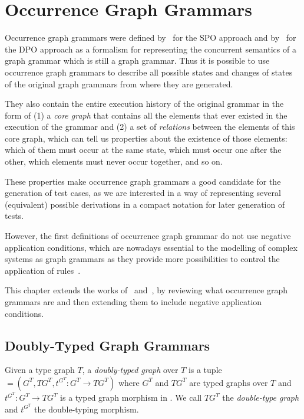 \chapter{Occurrence Graph Grammars}\label{ch:process}

Occurrence graph grammars were defined by~\cite{Ribeiro1996} for the SPO approach and by~\cite{Corradini1996} for the DPO approach as a formalism for representing the concurrent semantics of a graph grammar which is still a graph grammar. Thus it is possible to use occurrence graph grammars to describe all possible states and changes of states of the original graph grammars from where they are generated. 

They also contain the entire execution history of the original grammar in the form of (1) a \emph{core graph} that contains all the elements that ever existed in the execution of the grammar and (2) a set of \emph{relations} between the elements of this core graph, which can tell us properties about the existence of those elements: which of them must occur at the same state, which must occur one after the other, which elements must never occur together, and so on.

These properties make occurrence graph grammars a good candidate for the generation of test cases, as we are interested in a way of representing several (equivalent) possible derivations in a compact notation for later generation of tests.

However, the first definitions of occurrence graph grammar do not use negative application conditions, which are nowadays essential to the modelling of complex systems as graph grammars as they provide more possibilities to control the application of rules~\cite{Lambers2008, Corradini2014}.

This chapter extends the works of~\cite{Ribeiro1996} and~\cite{Corradini1996}, by reviewing what occurrence graph grammars are and then extending them to include negative application conditions.

\section{Doubly-Typed Graph Grammars}

\begin{definition} Given a type graph $T$, a \emph{doubly-typed graph} \doublyTypedGraph{} over $T$ is a tuple \doublyTypedGraph $= \left(G^T,TG^T, t^{G^T} : G^T \rightarrow TG^T\right)$ where $G^T$ and $TG^T$ are typed graphs over $T$ and \mbox{$t^{G^T} : G^T \rightarrow TG^T$} is a typed graph morphism in \typedGraphCategory{}. We call $TG^T$ the \emph{double-type graph} and $t^{G^T}$ the double-typing morphism.
\end{definition}

